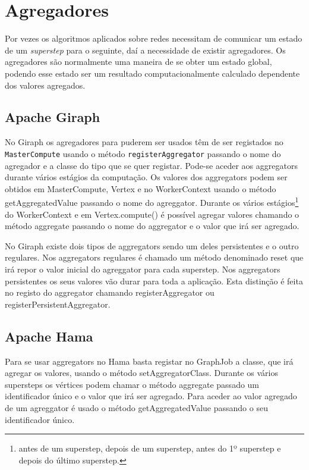 \newpage

\section{Agregadores}
  Por vezes os algoritmos aplicados sobre redes necessitam de comunicar um estado de um \textit{superstep} para o seguinte, daí a necessidade de existir agregadores. Os agregadores são normalmente uma maneira de se obter um estado global, podendo esse estado ser um resultado computacionalmente calculado dependente dos valores agregados.
  \subsection*{Apache Giraph}
    No Giraph os agregadores para puderem ser usados têm de ser registados no \texttt{MasterCompute} usando o método \texttt{registerAggregator}
    passando o nome do agregador e a classe do tipo que se quer registar. Pode-se aceder aos aggregators durante vários estágios da computação.
    Os valores dos aggregators podem ser obtidos em MasterCompute, Vertex e no WorkerContext usando o método getAggregatedValue passando
    o nome do agreggator.
    Durante os vários estágios\footnote{antes de um superstep, depois de um superstep, 
    antes do 1º superstep e depois do último superstep.} do WorkerContext e em Vertex.compute() é possível agregar valores chamando o método
    aggregate passando o nome do aggregator e o valor que irá ser agregado.
    
    No Giraph existe dois tipos de aggregators sendo um deles persistentes e o outro regulares. Nos aggregators regulares é chamado um método
    denominado reset que irá repor o valor inicial do agreggator para cada superstep. Nos aggregators persistentes os seus valores vão durar
    para toda a aplicação. Esta distinção é feita no registo do aggregator chamando registerAggregator 
    ou registerPersistentAggregator.
    
  \subsection*{Apache Hama}
    Para se usar aggregators no Hama basta registar no GraphJob a classe, que irá agregar os valores, usando o método
    setAggregatorClass. Durante os vários supersteps os vértices podem chamar o método aggregate passado um identificador único
    e o valor que irá ser agregado. Para aceder ao valor agregado de um agreggator é usado o método getAggregatedValue passando o seu 
    identificador único.
    
